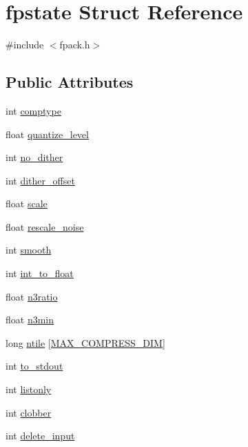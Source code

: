 \hypertarget{structfpstate}{}\section{fpstate Struct Reference}
\label{structfpstate}


{\ttfamily \#include $<$fpack.\+h$>$}

\subsection*{Public Attributes}
\begin{DoxyCompactItemize}
\item 
int \hyperlink{structfpstate_a2d8fedbc721a51e00961f0098c07d395}{comptype}
\item 
float \hyperlink{structfpstate_aab384c49d4fe7b54733906a22d5773bd}{quantize\+\_\+level}
\item 
int \hyperlink{structfpstate_a35674057cfdddee64ae8a02dfdd1e7be}{no\+\_\+dither}
\item 
int \hyperlink{structfpstate_a8cab9d5b8d5a4e45525016ee8962c661}{dither\+\_\+offset}
\item 
float \hyperlink{structfpstate_ae47fd7b4ddfae54d02a188ade2c8a00e}{scale}
\item 
float \hyperlink{structfpstate_a8cdef8bfe21865e4fa640d6eaca2aceb}{rescale\+\_\+noise}
\item 
int \hyperlink{structfpstate_ad88cd9c5cc659b92152669a553b7aa0c}{smooth}
\item 
int \hyperlink{structfpstate_aad5384985162180634ac4cfad0e13a7e}{int\+\_\+to\+\_\+float}
\item 
float \hyperlink{structfpstate_aef4bbc8c9f41b6ad717932c4a47fab14}{n3ratio}
\item 
float \hyperlink{structfpstate_af883ce5c33550dd9d1c60f3a2268a715}{n3min}
\item 
long \hyperlink{structfpstate_a0e898d11a9484eb22c607c15bf17c30f}{ntile} \mbox{[}\hyperlink{fitsio_8h_a490098c3c66339cb8e66ec352707f0d4}{M\+A\+X\+\_\+\+C\+O\+M\+P\+R\+E\+S\+S\+\_\+\+D\+IM}\mbox{]}
\item 
int \hyperlink{structfpstate_a771bb8f906dbb9e52983b5b650a4454a}{to\+\_\+stdout}
\item 
int \hyperlink{structfpstate_a48ff64957b37e0b8300dc25d378f9a8d}{listonly}
\item 
int \hyperlink{structfpstate_a8aea839280f5037b1cd8cfd34f0fa780}{clobber}
\item 
int \hyperlink{structfpstate_aa3f8f180c65bf68be6c2394c4fb96d96}{delete\+\_\+input}

\end{DoxyCompactItemize}
